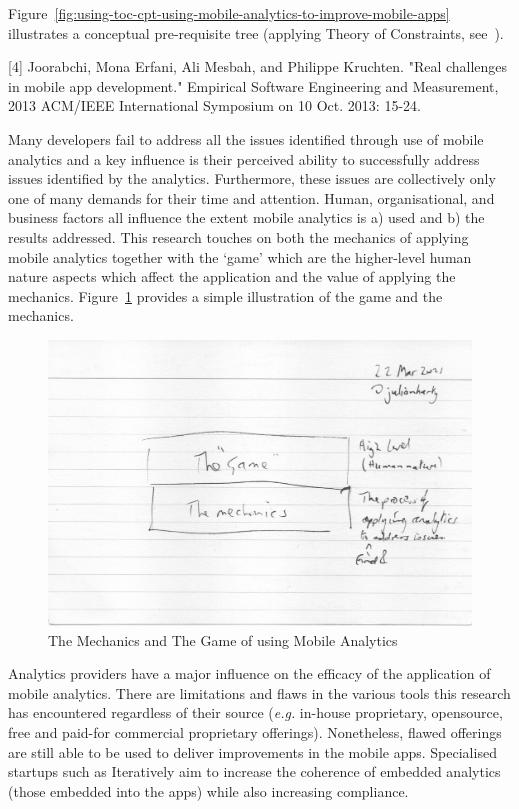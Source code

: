 Figure~\ref{fig:using-toc-cpt-using-mobile-analytics-to-improve-mobile-apps} illustrates a conceptual pre-requisite tree (applying Theory of Constraints, see~\citep{goldratt2017_necessary_but_not_sufficient, lepore1999_deming_and_goldratt, scheinkopf1999_thinking_for_a_change}). 


[4] Joorabchi, Mona Erfani, Ali Mesbah, and Philippe Kruchten. "Real challenges in mobile app development." Empirical Software Engineering and Measurement, 2013 ACM/IEEE International Symposium on 10 Oct. 2013: 15-24.


Many developers fail to address all the issues identified through use of mobile analytics and a key influence is their perceived ability to successfully address issues identified by the analytics. Furthermore, these issues are collectively only one of many demands for their time and attention. Human, organisational, and business factors all influence the extent mobile analytics is a) used and b) the results addressed. This research touches on both the mechanics of applying mobile analytics together with the `game' which are the higher-level human nature aspects which affect the application and the value of applying the mechanics. Figure~\ref{fig:the-mechanics-the-game} provides a simple illustration of the game and the mechanics.

\begin{figure}
    \centering
    \includegraphics[width=15cm]{images/rough-sketches/The-Mechanics-The-Game.jpeg}
    \caption{The Mechanics and The Game of using Mobile Analytics}
    \label{fig:the-mechanics-the-game}
\end{figure}

Analytics providers have a major influence on the efficacy of the application of mobile analytics. There are limitations and flaws in the various tools this research has encountered regardless of their source (\emph{e.g.} in-house proprietary, opensource, free and paid-for commercial proprietary offerings). Nonetheless, flawed offerings are still able to be used to deliver improvements in the mobile apps. Specialised startups such as Iteratively aim to increase the coherence of embedded analytics (those embedded into the apps) while also increasing compliance. 
